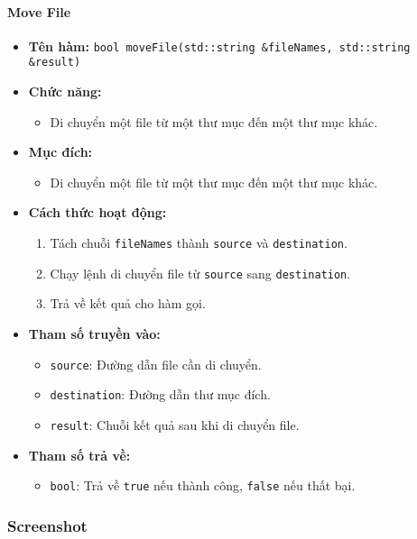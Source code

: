\paragraph{Move File}
\begin{itemize}
    \item \textbf{Tên hàm:} \texttt{bool moveFile(std::string \&fileNames, std::string \&result)}
    \item \textbf{Chức năng:}
    \begin{itemize}
        \item Di chuyển một file từ một thư mục đến một thư mục khác.
    \end{itemize}
    \item \textbf{Mục đích:}
    \begin{itemize}
        \item Di chuyển một file từ một thư mục đến một thư mục khác.
    \end{itemize}
    \item \textbf{Cách thức hoạt động:}
    \begin{enumerate}
        \item Tách chuỗi \texttt{fileNames} thành \texttt{source} và \texttt{destination}.
        \item Chạy lệnh di chuyển file từ \texttt{source} sang \texttt{destination}.
        \item Trả về kết quả cho hàm gọi.
    \end{enumerate}
    \item \textbf{Tham số truyền vào:}
    \begin{itemize}
        \item \texttt{source}: Đường dẫn file cần di chuyển.
        \item \texttt{destination}: Đường dẫn thư mục đích.
        \item \texttt{result}: Chuỗi kết quả sau khi di chuyển file.
    \end{itemize}
    \item \textbf{Tham số trả về:}
    \begin{itemize}
        \item \texttt{bool}: Trả về \texttt{true} nếu thành công, \texttt{false} nếu thất bại.
    \end{itemize}
\end{itemize}

\subsubsection{Screenshot}
\label{subsec:screenshot}

